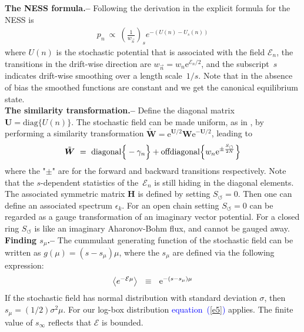 \documentclass[aps,pre,floats,floatfix,twocolumn]{revtex4}
\newcommand{\eexp}[1]{\mathrm{e}^{#1}}
\newcommand{\be}[1]{\begin{eqnarray}\ifthenelse{#1=-1}{\nonumber}{\ifthenelse{#1=0}{}{\label{e#1}}}}
\newcommand{\beq}{\begin{eqnarray}}
\newcommand{\eeq}{\end{eqnarray}}
\newcommand{\Eq}[1]{\textcolor{blue}{{equation}\!~(\ref{#1})}}
\newcommand{\sect}[1]{{\bf #1.-- }}
\begin{document}
\sect{The NESS formula}
%
Following the derivation in \cite{nes} the explicit formula for the NESS is   
%
\beq
p_n \ \propto \ \left( \frac{1}{w_{\overrightarrow{n}}}\right)_s e^{-\left(U(n)-U_s(n)\right)}
\eeq
%
where $U(n)$ is the stochastic potential that is associated with the field $\mathcal{E}_n$, 
the transitions in the drift-wise direction are $w_{\overrightarrow{n}}=w_n\eexp{\mathcal{E}_n/2}$, 
and the subscript~$s$ indicates drift-wise smoothing over a length scale~$1/s$. 
Note that in the absence of bias the smoothed functions are constant and we get the canonical equilibrium state.    
\\


\sect{The similarity transformation}
%
Define the diagonal matrix $\bm{U}=\mbox{diag}\{U(n)\}$. 
The stochastic field can be made uniform, as in \cite{Shnerb1}, 
by performing a similarity transformation ${\tilde{\bm{W}} = \eexp{{\bm{U}/2}} \bm{W} \eexp{-{\bm{U}/2}}}$,  
leading to 
%
\be{16}
\tilde{\bm{W}} \ = \ 
\text{diagonal}\Big\{-\gamma_{n}\Big\} 
+\text{offdiagonal}\Big\{  w_{n}\eexp{\pm \frac{S_{\circlearrowleft}}{2N}}  \Big\}
\eeq
%
where the "$\pm$" are for the forward and backward transitions respectively.
Note that the $s$-dependent statistics of the~$\mathcal{E}_n$ is still hiding in the diagonal elements.
The associated symmetric matrix $\bm{H}$ is defined by setting ${S_{\circlearrowleft}=0}$.
Then one can define an associated spectrum ${\epsilon_k}$.
For an open chain setting ${S_{\circlearrowleft}=0}$ can be regarded 
as a gauge transformation of an imaginary vector potential.
For a closed ring ${S_{\circlearrowleft}}$ is like an 
imaginary Aharonov-Bohm flux, and cannot be gauged away. 
\\

\sect{Finding $s_{\mu}$}
%
The cummulant generating function of the stochastic field 
can be written as $g(\mu)=(s-s_{\mu})\mu$,  
where the $s_{\mu}$ are defined via the following expression:   
%
\be{362}
\left\langle  e^{-\mathcal{E}\mu}\right\rangle \ \ \equiv \ \ \eexp{-(s-s_{\mu})\mu} 
\eeq
%  
If the stochastic field has normal distribution 
with standard deviation $\sigma$, then ${s_{\mu}=(1/2) \sigma^2 \mu}$.
For our log-box distribution \Eq{e5} applies. 
The finite value of $s_{\infty}$ reflects that $\mathcal{E}$ is bounded.  
\\
\end{document}
